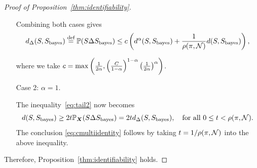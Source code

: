 \documentclass[11pt]{article}
\theoremstyle{plain}
\theoremstyle{definition}
\def\bayesS{S_{\textup{bayes}}}
\begin{document}
\begin{proof}[Proof of Proposition~\ref{thm:identifiability}]
\begin{enumerate}[label={2.\arabic*},wide, labelwidth=!, labelindent=0pt]
Combining both cases gives
\begin{align}\label{eq:cmultiidentity}
    d_\Delta(S,\bayesS) \stackrel{\text{def}}{=}\mathbb{P}(S\Delta\bayesS)\leq c\left(d^\alpha(S,\bayesS)+\frac{1}{\rho(\pi,\tN)}d(S,\bayesS)\right),
\end{align}

where we take $c= \max\left(\frac{1}{2\alpha},\left(C\over 1-\alpha\right)^{1-\alpha}\left(1\over 2\alpha\right)^\alpha\right)$. 

\item [Case 2:] $\alpha = 1$.

The inequality~\eqref{eq:tail2} now becomes
\[
d(S,\bayesS)\geq 2t\mathbb{P}_{\mX}(S\Delta \bayesS) = 2td_\Delta(S,\bayesS), \quad \text{for all }0\leq t < \rho(\pi,\tN).
\]
The conclusion \eqref{eq:cmultiidentity} follows by taking $t=1/\rho(\pi,\mathcal{N})$ into the above inequality.
\end{enumerate}
Therefore,  Proposition~\ref{thm:identifiability} holds.
\end{proof}
\end{document}

